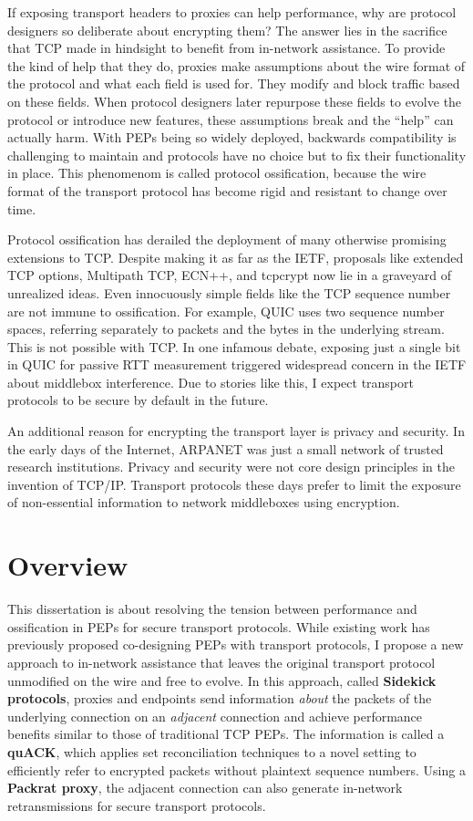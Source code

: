 If exposing transport headers to proxies can help performance, why are protocol
designers so deliberate about encrypting them? The answer lies in the sacrifice
that TCP made in hindsight to benefit from in-network assistance. To provide
the kind of help that they do, proxies make assumptions about the wire format
of the protocol and what each field is used for. They modify and block traffic
based on these fields. When protocol designers later repurpose these fields to
evolve the protocol or introduce new features, these assumptions break and the
``help'' can actually harm. With PEPs being so widely deployed, backwards
compatibility is challenging to maintain and protocols have no choice but to
fix their functionality in place. This phenomenom is called protocol
ossification, because the wire format of the transport protocol has become
rigid and resistant to change over time.

Protocol ossification has derailed the deployment of many otherwise promising
extensions to TCP. Despite making it as far as the IETF, proposals like
extended TCP options, Multipath TCP, ECN++, and tcpcrypt now lie in a graveyard
of unrealized ideas. Even innocuously simple fields like the TCP sequence
number are not immune to ossification. For example, QUIC uses two sequence
number spaces, referring separately to packets and the bytes in the underlying
stream. This is not possible with TCP. In one infamous debate, exposing just a
single bit in QUIC for passive RTT measurement triggered widespread concern in
the IETF about middlebox interference. Due to stories like this, I expect
transport protocols to be secure by default in the future.

An additional reason for encrypting the transport layer is privacy and security.
In the early days of the Internet, ARPANET was just a small network of trusted
research institutions. Privacy and security were not core design principles in
the invention of TCP/IP. Transport protocols these days prefer to limit the
exposure of non-essential information to network middleboxes using encryption.

\section{Overview}

This dissertation is about resolving the tension between performance and
ossification in PEPs for secure transport protocols. While existing work has
previously proposed co-designing PEPs with transport protocols, I propose a new
approach to in-network assistance that leaves the original transport protocol
unmodified on the wire and free to evolve. In this approach, called \textbf
{Sidekick protocols}, proxies and endpoints send information \textit{about} the
packets of the underlying connection on an \textit{adjacent} connection and
achieve performance benefits similar to those of traditional TCP PEPs. The
information is called a \textbf{quACK}, which applies set reconciliation
techniques to a novel setting to efficiently refer to encrypted packets without
plaintext sequence numbers. Using a \textbf{Packrat proxy}, the adjacent
connection can also generate in-network retransmissions for secure transport
protocols.

